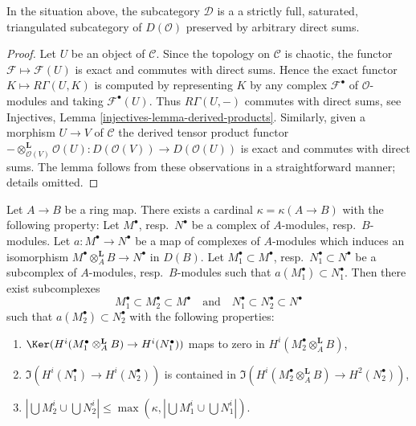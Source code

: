 \begin{lemma}
\label{lemma-cartesian-good-sub}
In the situation above, the subcategory $\mathcal{D}$ is a
a strictly full, saturated, triangulated subcategory of $D(\mathcal{O})$
preserved by arbitrary direct sums.
\end{lemma}

\begin{proof}
Let $U$ be an object of $\mathcal{C}$. Since the topology
on $\mathcal{C}$ is chaotic, the functor $\mathcal{F} \mapsto \mathcal{F}(U)$
is exact and commutes with direct sums. Hence the exact functor
$K \mapsto R\Gamma(U, K)$ is computed by representing $K$ by any complex
$\mathcal{F}^\bullet$ of $\mathcal{O}$-modules and taking
$\mathcal{F}^\bullet(U)$. Thus $R\Gamma(U, -)$ commutes with direct
sums, see Injectives, Lemma \ref{injectives-lemma-derived-products}.
Similarly, given a morphism $U \to V$ of $\mathcal{C}$
the derived tensor product functor
$- \otimes_{\mathcal{O}(V)}^\mathbf{L} \mathcal{O}(U) :
D(\mathcal{O}(V)) \to D(\mathcal{O}(U))$
is exact and commutes with direct sums. The lemma follows
from these observations in a straightforward manner; details omitted.
\end{proof}

\begin{lemma}
\label{lemma-enlarge}
Let $A \to B$ be a ring map. There exists a cardinal $\kappa = \kappa(A \to B)$
with the following property: Let $M^\bullet$, resp.\ $N^\bullet$
be a complex of $A$-modules, resp.\ $B$-modules. Let
$a : M^\bullet \to N^\bullet$ be a map of complexes of $A$-modules
which induces an isomorphism
$M^\bullet \otimes_A^\mathbf{L} B \to N^\bullet$ in $D(B)$.
Let $M_1^\bullet \subset M^\bullet$, resp.\ $N_1^\bullet \subset N^\bullet$
be a subcomplex of $A$-modules, resp.\ $B$-modules such that
$a(M_1^\bullet) \subset N_1^\bullet$. Then there exist
subcomplexes
$$
M_1^\bullet \subset M_2^\bullet \subset M^\bullet
\quad\text{and}\quad
N_1^\bullet \subset N_2^\bullet \subset N^\bullet
$$
such that $a(M_2^\bullet) \subset N_2^\bullet$
with the following properties:
\begin{enumerate}
\item $\Ker(H^i(M_1^\bullet \otimes_A^\mathbf{L} B) \to H^i(N_1^\bullet))$
maps to zero in $H^i(M_2^\bullet \otimes_A^\mathbf{L} B)$,
\item $\Im(H^i(N_1^\bullet) \to H^i(N_2^\bullet))$ is contained in
$\Im(H^i(M_2^\bullet \otimes_A^\mathbf{L} B) \to H^2(N_2^\bullet))$,
\item $|\bigcup M_2^i \cup \bigcup N_2^i| \leq
\max(\kappa, |\bigcup M_1^i \cup \bigcup N_1^i|)$.
\end{enumerate}
\end{lemma}

